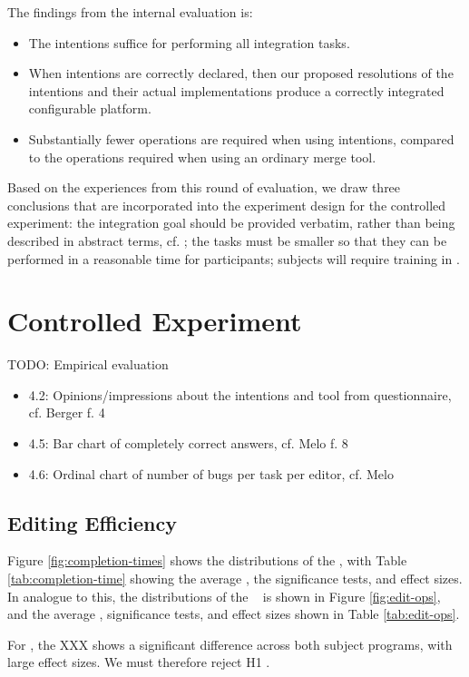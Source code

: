The findings from the internal evaluation is:

\begin{itemize}
    \item The intentions suffice for performing all integration tasks.
    \item When intentions are correctly declared, then our proposed resolutions of the intentions and their actual implementations produce a correctly integrated configurable platform.
    \item Substantially fewer operations are required when using intentions, compared to the operations required when using an ordinary merge tool.
\end{itemize}

Based on the experiences from this round of evaluation, we draw three conclusions that are incorporated into the experiment design for the controlled experiment: the integration goal should be provided verbatim, rather than being described in abstract terms, cf. \cite{berger2016mps}; the tasks must be smaller so that they can be performed in a reasonable time for participants; subjects will require training in \tooln.


\section{Controlled Experiment}
TODO: Empirical evaluation
\begin{itemize}
    \item 4.2: Opinions/impressions about the intentions and tool from questionnaire, cf. Berger f. 4
    \item 4.5: Bar chart of completely correct answers, cf. Melo f. 8
    \item 4.6: Ordinal chart of number of bugs per task per editor, cf. Melo
\end{itemize}

\subsection{Editing Efficiency}
Figure \ref{fig:completion-times} shows the distributions of the \ctimes, with Table \ref{tab:completion-time} showing the average \ctimes, the significance tests, and effect sizes. In analogue to this, the distributions of the \eops~ is shown in Figure \ref{fig:edit-ops}, and the average \eops, significance tests, and effect sizes shown in Table \ref{tab:edit-ops}.

For \ctimes, the XXX shows a significant difference across both subject programs, with large effect sizes. We must therefore reject H1 \HA.

